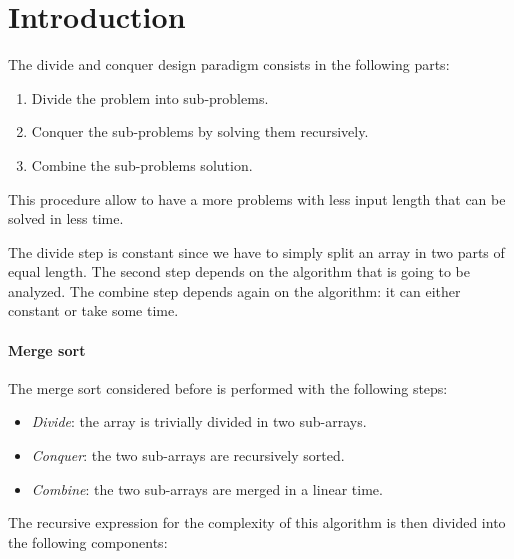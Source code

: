 \section{Introduction}

The divide and conquer design paradigm consists in the following parts: 
\begin{enumerate}
    \item Divide the problem into sub-problems. 
    \item Conquer the sub-problems by solving them recursively. 
    \item Combine the sub-problems solution. 
\end{enumerate}
This procedure allow to have a more problems with less input length that can be solved in less time. 

The divide step is constant since we have to simply split an array in two parts of equal length. 
The second step depends on the algorithm that is going to be analyzed.
The combine step depends again on the algorithm: it can either constant or take some time. 

\paragraph*{Merge sort}
The merge sort considered before is performed with the following steps: 
\begin{itemize}
    \item \textit{Divide}: the array is trivially divided in two sub-arrays. 
    \item \textit{Conquer}: the two sub-arrays are recursively sorted. 
    \item \textit{Combine}: the two sub-arrays are merged in a linear time. 
\end{itemize}
The recursive expression for the complexity of this algorithm is then divided into the following components: 